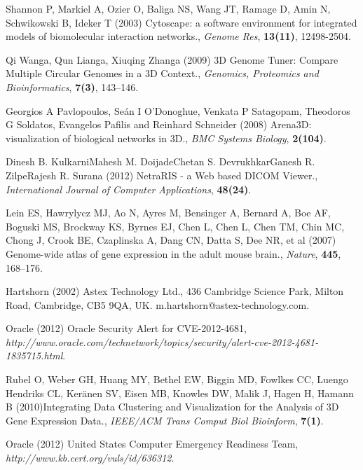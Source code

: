 \documentclass{bioinfo}
\begin{document}
\begin{thebibliography}{}
 Shannon P, Markiel A, Ozier O, Baliga NS, Wang JT, Ramage D, Amin N, Schwikowski B, Ideker T (2003) Cytoscape: a software environment for integrated models of biomolecular interaction networks., {\it Genome Res}, {\bf 13(11)}, 12498-2504.

 Qi Wanga, Qun Lianga, Xiuqing Zhanga (2009) 3D Genome Tuner: Compare Multiple Circular Genomes in a 3D Context., {\it Genomics, Proteomics and Bioinformatics}, {\bf 7(3)}, 143–146.

 Georgios A Pavlopoulos, Seán I O'Donoghue, Venkata P Satagopam, Theodoros G Soldatos, Evangelos Pafilis and Reinhard Schneider (2008) Arena3D: visualization of biological networks in 3D., {\it BMC Systems Biology}, {\bf 2(104)}.

 Dinesh B. KulkarniMahesh M. DoijadeChetan S. DevrukhkarGanesh R. ZilpeRajesh R. Surana (2012) NetraRIS - a Web based DICOM Viewer., {\it International Journal of Computer Applications}, {\bf 48(24)}.

 Lein ES, Hawrylycz MJ, Ao N, Ayres M, Bensinger A, Bernard A, Boe AF, Boguski MS, Brockway KS, Byrnes EJ, Chen L, Chen L, Chen TM, Chin MC, Chong J, Crook BE, Czaplinska A, Dang CN, Datta S, Dee NR, et al (2007) Genome-wide atlas of gene expression in the adult mouse brain., {\it Nature}, {\bf 445}, 168–176.


 Hartshorn (2002) Astex Technology Ltd., 436 Cambridge Science Park, Milton Road, Cambridge, CB5 9QA, UK. m.hartshorn@astex-technology.com.

 Oracle (2012) Oracle Security Alert for CVE-2012-4681, {\it http://www.oracle.com/technetwork/topics/security/alert-cve-2012-4681-1835715.html}.

 Rubel O, Weber GH, Huang MY, Bethel EW, Biggin MD, Fowlkes CC, Luengo Hendriks CL, Keränen SV, Eisen MB, Knowles DW, Malik J, Hagen H, Hamann B (2010)Integrating Data Clustering and Visualization for the Analysis of 3D Gene Expression Data., {\it IEEE/ACM Trans Comput Biol Bioinform}, {\bf 7(1)}.

 Oracle (2012) United States Computer Emergency Readiness Team, {\it http://www.kb.cert.org/vuls/id/636312}.




\end{thebibliography}
\end{document}

